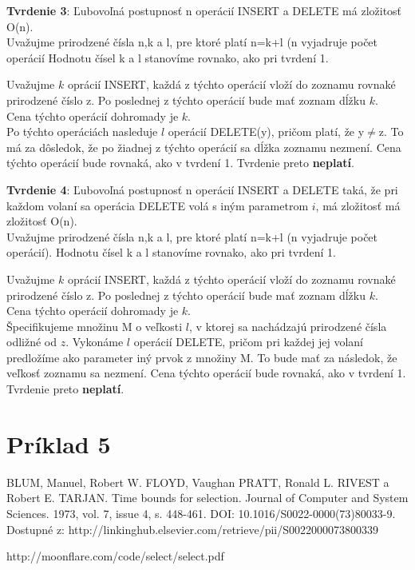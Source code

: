 \documentclass[paper=a4, fontsize=11pt]{scrartcl} %
\numberwithin{equation}{section} %
\numberwithin{figure}{section} %
\numberwithin{table}{section} %
\begin{document}
\textbf{Tvrdenie 3}: Ľubovoľná postupnosť n operácií INSERT a DELETE má zložitosť O(n). \\

Uvažujme prirodzené čísla n,k a l, pre ktoré platí n=k+l (n vyjadruje počet operácií
Hodnotu čísel k a l stanovíme rovnako, ako pri tvrdení 1.

Uvažujme $k$ oprácií INSERT, každá z týchto operácií vloží do zoznamu rovnaké prirodzené číslo z.
Po poslednej z týchto operácií bude mať zoznam dĺžku $k$. \\

Cena týchto operácií dohromady je $k$. \\

Po týchto operáciách nasleduje $l$ operácií DELETE(y), pričom platí, že y$\neq$z. To má za dôsledok, že po žiadnej z týchto operácií sa dĺžka zoznamu nezmení. Cena týchto operácií bude rovnaká, ako v tvrdení 1.
Tvrdenie preto \textbf{neplatí}.

\textbf{Tvrdenie 4}: Ľubovoľná postupnosť n operácií INSERT a DELETE taká, že pri každom volaní sa operácia DELETE volá s iným parametrom $i$, má zložitosť má zložitosť O(n). \\

Uvažujme prirodzené čísla n,k a l, pre ktoré platí n=k+l (n vyjadruje počet operácií).
Hodnotu čísel k a l stanovíme rovnako, ako pri tvrdení 1.

Uvažujme $k$ oprácií INSERT, každá z týchto operácií vloží do zoznamu rovnaké prirodzené číslo z.
Po poslednej z týchto operácií bude mať zoznam dĺžku $k$. \\

Cena týchto operácií dohromady je $k$. \\

Špecifikujeme množinu M o veľkosti $l$, v ktorej sa nachádzajú prirodzené čísla odližné od $z$.
Vykonáme $l$ operácií DELETE, pričom pri každej jej volaní predložíme ako parameter iný prvok z množiny M.
To bude mať za následok, že veľkosť zoznamu sa nezmení. Cena týchto operácií bude rovnaká, ako v tvrdení 1.
Tvrdenie preto \textbf{neplatí}.





\pagebreak

\section*{Príklad 5}
\begin{thebibliography}{1}
 BLUM, Manuel, Robert W. FLOYD, Vaughan PRATT, Ronald L. RIVEST a Robert E. TARJAN.
Time bounds for selection.
Journal of Computer and System Sciences. 1973, vol. 7, issue 4, s. 448-461.
DOI: 10.1016/S0022-0000(73)80033-9.
Dostupné z: http://linkinghub.elsevier.com/retrieve/pii/S0022000073800339

 http://moonflare.com/code/select/select.pdf
\end{thebibliography}
\end{document}

